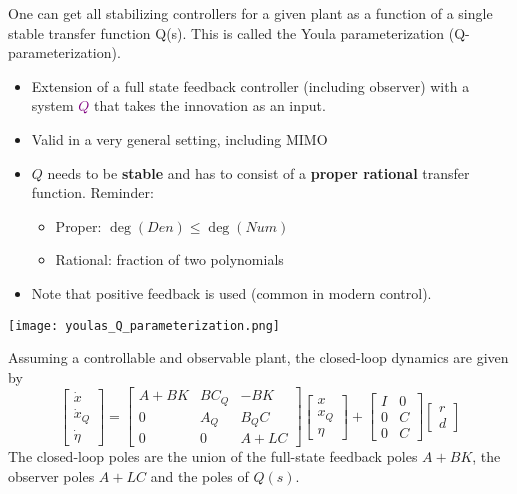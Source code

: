 One can get all stabilizing controllers for a given plant as a function of a single stable transfer function Q(s). This is called the Youla parameterization (Q-parameterization).
\begin{itemize}
    \item Extension of a full state feedback controller (including observer) with a system \textcolor{purple}{$Q$} that takes the innovation as an input.
    \item Valid in a very general setting, including MIMO
    \item $Q$ needs to be \textbf{stable} and has to consist of a \textbf{proper rational} transfer function. Reminder:
          \begin{itemize}
              \item Proper: $\deg(Den)\le \deg(Num)$
              \item Rational: fraction of two polynomials
          \end{itemize}
    \item Note that positive feedback is used (common in modern control).
\end{itemize}

\begin{center}
    \texttt{[image: youlas\_Q\_parameterization.png]}
\end{center}
\newpar{}
Assuming a controllable and observable plant, the closed-loop dynamics are given by
\begin{equation*}
    \begin{bmatrix}
        \dot{x}   \\
        \dot{x}_Q \\
        \dot{\eta}
    \end{bmatrix}
    =
    \begin{bmatrix}
        A+BK & BC_Q & -BK   \\
        0    & A_Q  & B_Q C \\
        0    & 0    & A+LC
    \end{bmatrix}
    \begin{bmatrix}
        x   \\
        x_Q \\
        \eta
    \end{bmatrix}
    +
    \begin{bmatrix}
        I & 0 \\
        0 & C \\
        0 & C
    \end{bmatrix}
    \begin{bmatrix}
        r \\
        d
    \end{bmatrix}
\end{equation*}
The closed-loop poles are the union of the full-state feedback poles $A+BK$, the observer poles $A+LC$ and the poles of $Q(s)$.

